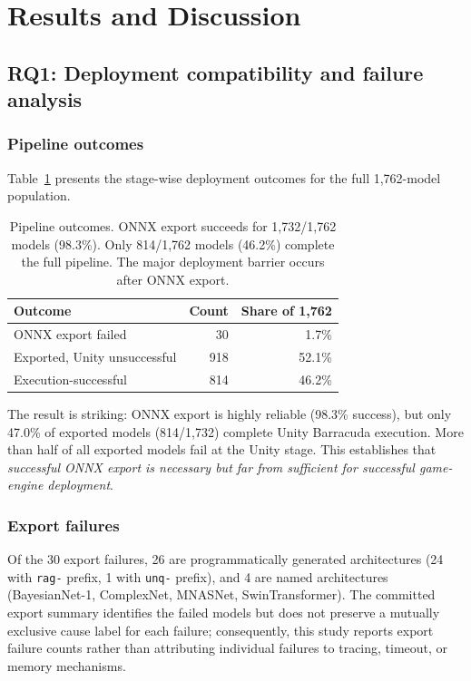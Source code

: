 \documentclass[10pt,twocolumn]{article}
\begin{document}
\section{Results and Discussion}\label{sec:rq1}
\subsection{RQ1: Deployment compatibility and failure analysis}

\subsubsection{Pipeline outcomes}

Table~\ref{tab:success} presents the stage-wise deployment outcomes for the full 1,762-model population.

\begin{table}[t]
\centering\small
\begin{tabular}{lrr}
\toprule
Outcome & Count & Share of 1,762 \\
\midrule
ONNX export failed & 30 & 1.7\% \\
Exported, Unity unsuccessful & 918 & 52.1\% \\
Execution-successful & 814 & 46.2\% \\
\bottomrule
\end{tabular}
\caption{Pipeline outcomes. ONNX export succeeds for 1,732/1,762 models (98.3\%). Only 814/1,762 models (46.2\%) complete the full pipeline. The major deployment barrier occurs after ONNX export.}
\label{tab:success}
\end{table}

The result is striking: ONNX export is highly reliable (98.3\% success), but only 47.0\% of exported models (814/1,732) complete Unity Barracuda execution. More than half of all exported models fail at the Unity stage. This establishes that \emph{successful ONNX export is necessary but far from sufficient for successful game-engine deployment}.

\CompatibilityFigure

\subsubsection{Export failures}

Of the 30 export failures, 26 are programmatically generated architectures (24 with \texttt{rag-} prefix, 1 with \texttt{unq-} prefix), and 4 are named architectures (BayesianNet-1, ComplexNet, MNASNet, SwinTransformer). The committed export summary identifies the failed models but does not preserve a mutually exclusive cause label for each failure; consequently, this study reports export failure counts rather than attributing individual failures to tracing, timeout, or memory mechanisms.
\end{document}
